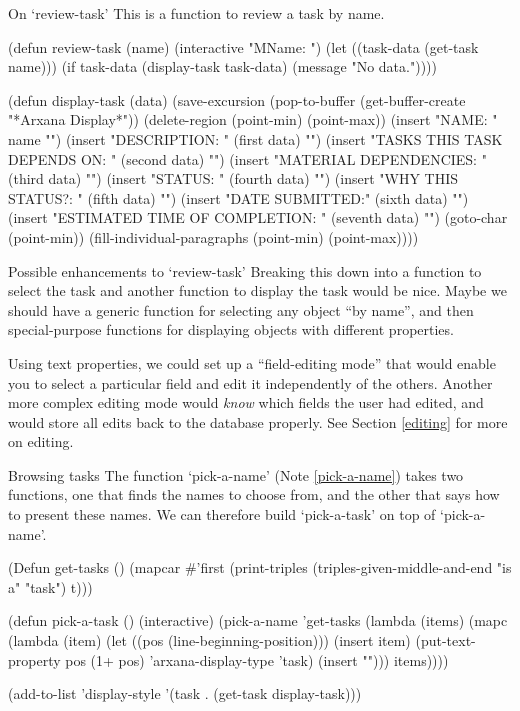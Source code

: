 \begin{notate}{On `review-task'} \label{review-task}
This is a function to review a task by name.
\end{notate}

\begin{elisp}
(defun review-task (name)
  (interactive "MName: ")
  (let ((task-data (get-task name)))
    (if task-data
        (display-task task-data)
      (message "No data."))))

(defun display-task (data)
  (save-excursion
    (pop-to-buffer (get-buffer-create
                    "*Arxana Display*"))
    (delete-region (point-min) (point-max))
    (insert "NAME: " name "\n\n")
    (insert "DESCRIPTION: " (first data) "\n\n")
    (insert "TASKS THIS TASK DEPENDS ON: "
            (second data) "\n\n")
    (insert "MATERIAL DEPENDENCIES: "
            (third data) "\n\n")
    (insert "STATUS: " (fourth data) "\n\n")
    (insert "WHY THIS STATUS?: " (fifth data) "\n\n")
    (insert "DATE SUBMITTED:" (sixth data) "\n\n")
    (insert "ESTIMATED TIME OF COMPLETION: "
            (seventh data) "\n\n")
    (goto-char (point-min))
    (fill-individual-paragraphs (point-min) (point-max))))
\end{elisp}

\begin{notate}{Possible enhancements to `review-task'}
Breaking this down into a function to select the task and
another function to display the task would be nice.  Maybe
we should have a generic function for selecting any object
``by name'', and then special-purpose functions for
displaying objects with different properties.

Using text properties, we could set up a ``field-editing
mode'' that would enable you to select a particular field
and edit it independently of the others.  Another more
complex editing mode would \emph{know} which fields the
user had edited, and would store all edits back to the
database properly.  See Section \ref{editing} for more on
editing.
\end{notate}

\begin{notate}{Browsing tasks} \label{browsing-tasks}
The function `pick-a-name' (Note \ref{pick-a-name}) takes
two functions, one that finds the names to choose from,
and the other that says how to present these names.  We
can therefore build `pick-a-task' on top of `pick-a-name'.
\end{notate}

\begin{elisp}
(Defun get-tasks ()
  (mapcar #'first
          (print-triples
           (triples-given-middle-and-end "is a" "task")
           t)))

(defun pick-a-task ()
  (interactive)
  (pick-a-name
   'get-tasks
   (lambda (items)
     (mapc (lambda (item)
             (let ((pos (line-beginning-position)))
               (insert item)
               (put-text-property pos (1+ pos)
                                  'arxana-display-type
                                  'task)
               (insert "\n"))) items))))

(add-to-list 'display-style
             '(task . (get-task display-task)))
\end{elisp}


